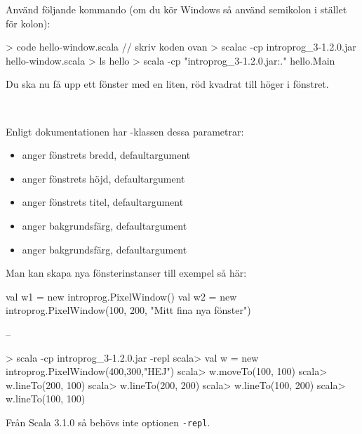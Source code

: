 Använd följande kommando (om du kör Windows så använd semikolon i stället för kolon):
\begin{REPL}
> code hello-window.scala  // skriv koden ovan
> scalac -cp introprog_3-1.2.0.jar hello-window.scala
> ls hello
> scala -cp "introprog_3-1.2.0.jar:." hello.Main
\end{REPL}
\noindent Du ska nu få upp ett fönster med en liten, röd kvadrat till höger i fönstret.


\SOLUTION

\TaskSolved \what~

\SubtaskSolved Enligt dokumentationen har -klassen dessa parametrar:
\begin{itemize}[nolistsep,noitemsep]
  \item {} anger fönstrets bredd, defaultargument 
  \item {} anger fönstrets höjd, defaultargument 
  \item {} anger fönstrets titel, defaultargument 
  \item {} anger bakgrundsfärg, defaultargument 
  \item {} anger bakgrundsfärg, defaultargument 
\end{itemize}
Man kan skapa nya fönsterinstanser till exempel så här:
\begin{Code}
val w1 = new introprog.PixelWindow()
val w2 = new introprog.PixelWindow(100, 200, "Mitt fina nya fönster")
\end{Code}

\SubtaskSolved --

\SubtaskSolved
\begin{REPL}
> scala -cp introprog_3-1.2.0.jar -repl
scala> val w = new introprog.PixelWindow(400,300,"HEJ")
scala> w.moveTo(100, 100)
scala> w.lineTo(200, 100)
scala> w.lineTo(200, 200)
scala> w.lineTo(100, 200)
scala> w.lineTo(100, 100)
\end{REPL}
Från Scala 3.1.0 så behövs inte optionen \texttt{-repl}.

